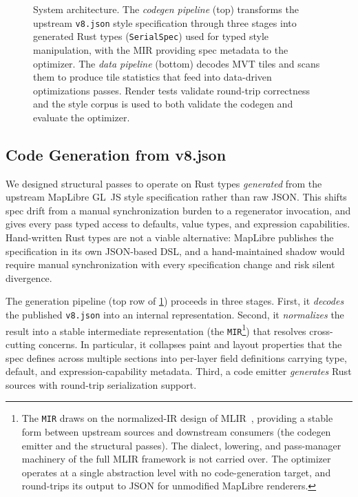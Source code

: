 \begin{figure}[htbp]
    \caption{
System architecture.
    The \emph{codegen pipeline} (top) transforms the upstream \texttt{v8.json} style specification through three stages into generated Rust types (\texttt{SerialSpec}) used for typed style manipulation, with the MIR providing spec metadata to the optimizer.
    The \emph{data pipeline} (bottom) decodes \acs{MVT} tiles and scans them to produce tile statistics that feed into data-driven optimizations passes.
Render tests validate round-trip correctness and the style corpus is used to both validate the codegen and evaluate the optimizer.}
    \label{fig:system_architecture}
\end{figure}

\subsection{Code Generation from v8.json}\label{sub:codegen}

We designed structural passes to operate on Rust types \emph{generated} from the upstream MapLibre GL~JS style specification rather than raw \ac{JSON}.
This shifts spec drift from a manual synchronization burden to a regenerator invocation, and gives every pass typed access to defaults, value types, and expression capabilities.
Hand-written Rust types are not a viable alternative: MapLibre publishes the specification in its own \ac{JSON}-based \ac{DSL}, and a hand-maintained shadow would require manual synchronization with every specification change and risk silent divergence.

The generation pipeline (top row of \cref{fig:system_architecture}) proceeds in three stages.
First, it \emph{decodes} the published \texttt{v8.json} into an internal representation.
Second, it \emph{normalizes} the result into a stable intermediate representation (the \texttt{MIR}\footnote{The \texttt{MIR} draws on the normalized-IR design of MLIR~\cite{lattnerMLIRScalingCompiler2021}, providing a stable form between upstream sources and downstream consumers (the codegen emitter and the structural passes).
The dialect, lowering, and pass-manager machinery of the full MLIR framework is not carried over.
The optimizer operates at a single abstraction level with no code-generation target, and round-trips its output to JSON for unmodified MapLibre renderers.}) that resolves cross-cutting concerns.
In particular, it collapses paint and layout properties that the spec defines across multiple sections into per-layer field definitions carrying type, default, and expression-capability metadata.
Third, a code emitter \emph{generates} Rust sources with round-trip serialization support.

